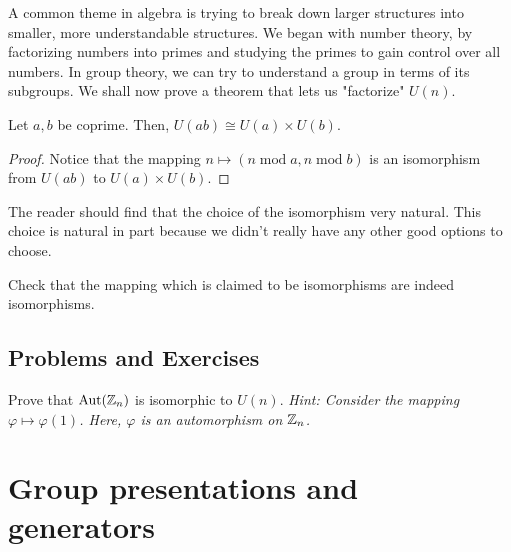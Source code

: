 \documentclass[./main.tex]{subfiles}
\begin{document}
A common theme in algebra is trying to break down larger structures into
smaller, more understandable structures. We began with number theory, by
factorizing numbers into primes and studying the primes to gain control over all
numbers. In group theory, we can try to understand a group in terms of its
subgroups. We shall now prove a theorem that lets us "factorize" $U(n)$. 
\begin{theorem}[Structure of $U(n)$]
    Let $a, b$ be coprime. Then, $U(ab) \cong U(a) \times U(b)$.
\end{theorem}
\begin{proof}
    Notice that the mapping $n \mapsto (n \operatorname{mod} a, n
    \operatorname{mod} b)$ is an isomorphism from $U(ab)$ to $U(a) \times U(b)$.
\end{proof}
The reader should find that the choice of the isomorphism very natural. This
choice is natural in part because we didn't really have any other good options
to choose. 
\begin{exercise}
    Check that the mapping which is claimed to be isomorphisms are indeed isomorphisms.
\end{exercise}

\subsection{Problems and Exercises}
\begin{exercise}
\label{ex:automorphisms-on-zn}
    Prove that $\operatorname{Aut}(\mathbb{Z}_n)$ is isomorphic to $U(n)$.
    \textit{Hint: Consider the mapping $\varphi \mapsto \varphi(1)$. Here,
    $\varphi$ is an automorphism on $\mathbb{Z}_n$.}
\end{exercise}


\section{Group presentations and generators}


\end{document}
